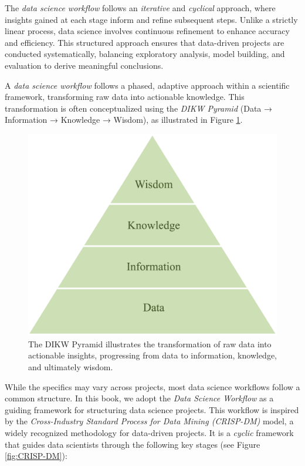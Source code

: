 \documentclass[
  11pt,
]{book}
\theoremstyle{definition}
\theoremstyle{definition}
\theoremstyle{definition}
\theoremstyle{definition}
\theoremstyle{remark}
\begin{document}
The \emph{data science workflow} follows an \emph{iterative} and \emph{cyclical} approach, where insights gained at each stage inform and refine subsequent steps. Unlike a strictly linear process, data science involves continuous refinement to enhance accuracy and efficiency. This structured approach ensures that data-driven projects are conducted systematically, balancing exploratory analysis, model building, and evaluation to derive meaningful conclusions.

A \emph{data science workflow} follows a phased, adaptive approach within a scientific framework, transforming raw data into actionable knowledge. This transformation is often conceptualized using the \emph{DIKW Pyramid} (Data → Information → Knowledge → Wisdom), as illustrated in Figure \ref{fig:DIKW-Pyramid}.

\begin{figure}[H]

{\centering \includegraphics[width=0.5\linewidth]{images/ch2_DIKW-Pyramid} 

}

\caption{The DIKW Pyramid illustrates the transformation of raw data into actionable insights, progressing from data to information, knowledge, and ultimately wisdom.}\label{fig:DIKW-Pyramid}
\end{figure}

While the specifics may vary across projects, most data science workflows follow a common structure. In this book, we adopt the \emph{Data Science Workflow} as a guiding framework for structuring data science projects. This workflow is inspired by the \emph{Cross-Industry Standard Process for Data Mining (CRISP-DM)} model, a widely recognized methodology for data-driven projects. It is a \emph{cyclic} framework that guides data scientists through the following key stages (see Figure \ref{fig:CRISP-DM}):
\end{document}
